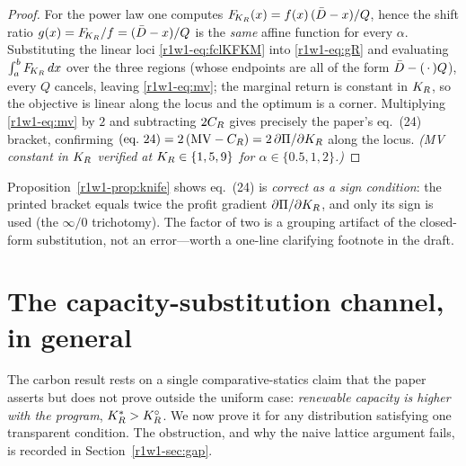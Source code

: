 \begin{proof}
For the power law one computes $F_{\!K_R}(x)=f(x)\,(\bar D-x)/Q$, hence the shift ratio
$g(x)=F_{\!K_R}/f=(\bar D-x)/Q$ is the \emph{same} affine function for every $\alpha$.
Substituting the linear loci \eqref{r1w1-eq:fclKFKM} into \eqref{r1w1-eq:gR} and evaluating
$\int_a^bF_{\!K_R}\,dx$ over the three regions (whose endpoints are all of the form
$\bar D-(\,\cdot\,)Q$), every $Q$ cancels, leaving \eqref{r1w1-eq:mv}; the marginal
return is constant in $K_R$, so the objective is linear along the locus and the
optimum is a corner. Multiplying \eqref{r1w1-eq:mv} by $2$ and subtracting $2C_R$
gives precisely the paper's eq.\ (24) bracket, confirming
$\text{(eq.\ 24)}=2\,(\mathrm{MV}-\CR)=2\,\partial\Pi/\partial\KR$ along the
locus. \emph{(MV constant in $K_R$ verified at $K_R\in\{1,5,9\}$ for
$\alpha\in\{0.5,1,2\}$.)}
\end{proof}

\begin{remark}[On eq.\ (24)]
Proposition~\ref{r1w1-prop:knife} shows eq.\ (24) is \emph{correct as a sign
condition}: the printed bracket equals twice the profit gradient
$\partial\Pi/\partial K_R$, and only its sign is used (the $\infty/0$
trichotomy). The factor of two is a grouping artifact of the closed-form
substitution, not an error---worth a one-line clarifying footnote in the draft.
\end{remark}

\section{The capacity-substitution channel, in general}\label{r1w1-sec:capacity}

The carbon result rests on a single comparative-statics claim that the paper
asserts but does not prove outside the uniform case: \emph{renewable capacity is
higher with the program}, $K_R^{*}>K_R^{\circ}$. We now prove it for any distribution
satisfying one transparent condition. The obstruction, and why the naive
lattice argument fails, is recorded in Section~\ref{r1w1-sec:gap}.

